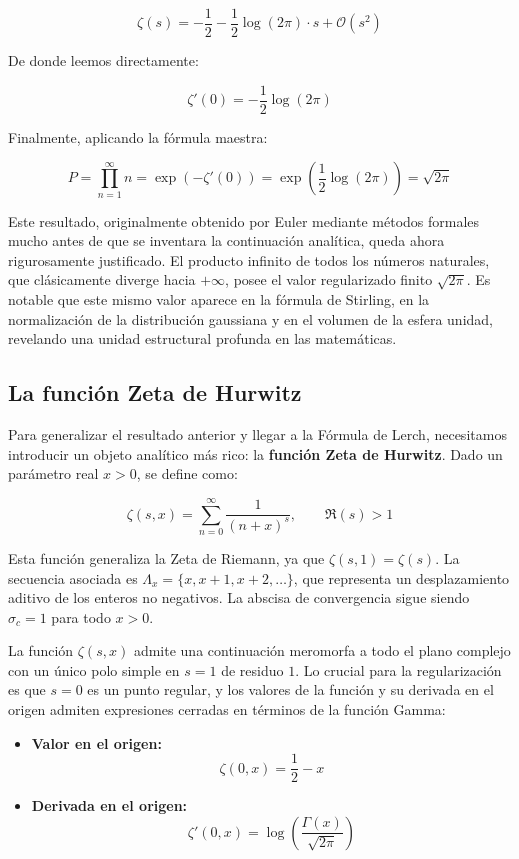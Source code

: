 $$ \zeta(s) = -\frac{1}{2} - \frac{1}{2}\log(2\pi) \cdot s + \mathcal{O}(s^2) $$

De donde leemos directamente:

$$ \zeta'(0) = -\frac{1}{2}\log(2\pi) $$

Finalmente, aplicando la fórmula maestra:

$$ P = \prod_{n=1}^{\infty} n = \exp(-\zeta'(0)) = \exp\left(\frac{1}{2}\log(2\pi)\right) = \sqrt{2\pi} $$

Este resultado, originalmente obtenido por Euler mediante métodos formales mucho antes de que se inventara la continuación analítica, queda ahora rigurosamente justificado. El producto infinito de todos los números naturales, que clásicamente diverge hacia $+\infty$, posee el valor regularizado finito $\sqrt{2\pi}$. Es notable que este mismo valor aparece en la fórmula de Stirling, en la normalización de la distribución gaussiana y en el volumen de la esfera unidad, revelando una unidad estructural profunda en las matemáticas.

\subsection{La función Zeta de Hurwitz}

Para generalizar el resultado anterior y llegar a la Fórmula de Lerch, necesitamos introducir un objeto analítico más rico: la \textbf{función Zeta de Hurwitz}. Dado un parámetro real $x > 0$, se define como:

$$ \zeta(s, x) = \sum_{n=0}^{\infty} \frac{1}{(n+x)^s}, \qquad \Re(s) > 1 $$

Esta función generaliza la Zeta de Riemann, ya que $\zeta(s, 1) = \zeta(s)$. La secuencia asociada es $\Lambda_x = \{x, x+1, x+2, \dots\}$, que representa un desplazamiento aditivo de los enteros no negativos. La abscisa de convergencia sigue siendo $\sigma_c = 1$ para todo $x > 0$.

La función $\zeta(s, x)$ admite una continuación meromorfa a todo el plano complejo con un único polo simple en $s=1$ de residuo $1$. Lo crucial para la regularización es que $s=0$ es un punto regular, y los valores de la función y su derivada en el origen admiten expresiones cerradas en términos de la función Gamma:

\begin{itemize}
    \item \textbf{Valor en el origen:}
    $$ \zeta(0, x) = \frac{1}{2} - x $$
    
    \item \textbf{Derivada en el origen:}
    $$ \zeta'(0, x) = \log\left(\frac{\Gamma(x)}{\sqrt{2\pi}}\right) $$
\end{itemize}

